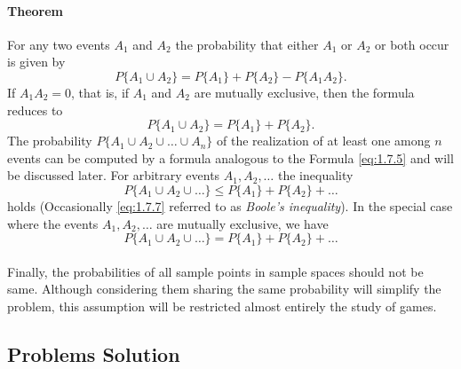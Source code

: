 \documentclass{article}
\numberwithin{equation}{subsection}
\begin{document}
			\paragraph{Theorem} For any two events $A_1$ and $A_2$ the probability that either $A_1$ or $A_2$ or both occur is given by 
			\begin{equation}
				\label{eq:1.7.5}
				P\{A_1\cup A_2\} = P\{A_1\}+P\{A_2\}-P\{A_1A_2\}. 
			\end{equation}
			If $A_1A_2 = 0$, that is, if $A_1$ and $A_2$ are mutually exclusive, then the formula reduces to 			
			\begin{equation}
				\label{eq:1.7.6}
				P\{A_1\cup A_2\} = P\{A_1\}+P\{A_2\}.
			\end{equation}			
			The probability $P\{A_1\cup A_2\cup \dots \cup A_n\}$ of the realization of at least one among $n$ events can be computed by a formula analogous to the Formula \eqref{eq:1.7.5} and will be discussed later. For arbitrary events $A_1,A_2,\dots$ the inequality
			\begin{equation}
				\label{eq:1.7.7}
				P\{A_1\cup A_2\cup \dots\} \leq P\{A_1\} + P\{A_2\} + \dots
			\end{equation}
			holds (Occasionally \eqref{eq:1.7.7} referred to as \textit{Boole's inequality}). In the special case where the events $A_1,A_2,\dots$ are mutually exclusive, we have 
			\begin{equation}
				\label{eq:1.7.8}
				P\{A_1\cup A_2\cup \dots\} = P\{A_1\} + P\{A_2\} + \dots
			\end{equation}
			\paragraph{} Finally, the probabilities of all sample points in sample spaces should not be same. Although considering them sharing the same probability will simplify the problem, this assumption will be restricted almost entirely the study of games.
		\subsection{Problems Solution}
\end{document}
